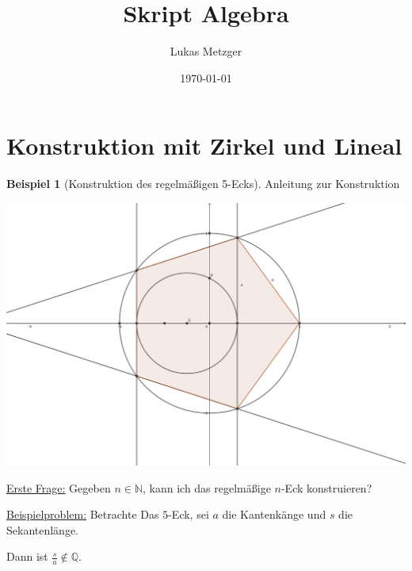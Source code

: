 \documentclass[12pt,parskip=full]{scrartcl}
\title{Skript Algebra}
\author{Lukas Metzger}
\date{\today}
\newcommand{\setN}{\mathbb{N}}
\newcommand{\setQ}{\mathbb{Q}}
\newcommand{\heading}{\underline}
\theoremstyle{definition}
\newtheorem{example}[theorem]{Beispiel}
\theoremstyle{remark}
\begin{document}
	\maketitle
	
	\setcounter{section}{-1}
	\section{Konstruktion mit Zirkel und Lineal}
	
	\begin{example}[Konstruktion des regelmäßigen 5-Ecks]
		Anleitung zur Konstruktion
		\begin{center}
			\includegraphics[width=0.8\linewidth]{bilder/bild1.png}
		\end{center}
	\end{example}

	\heading{Erste Frage:} Gegeben $n \in \setN$, kann ich das regelmäßige $n$-Eck konstruieren?
	
	\heading{Beispielproblem:} Betrachte Das $5$-Eck, sei $a$ die Kantenkänge und $s$ die Sekantenlänge.
	
	Dann ist $\frac{s}{a} \notin \setQ$.
	
\end{document}

